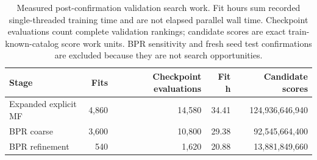 \begin{table}[H]
\centering
\caption{Measured post-confirmation validation search work. Fit hours sum recorded single-threaded training time and are not elapsed parallel wall time. Checkpoint evaluations count complete validation rankings; candidate scores are exact train-known-catalog score work units. BPR sensitivity and fresh seed test confirmations are excluded because they are not search opportunities.}
\label{tab:robustness-search-cost}
\small
\begin{tabular}{@{}lrrrr@{}}
\toprule
Stage & Fits & Checkpoint evaluations & Fit h & Candidate scores \\
\midrule
Expanded explicit MF & 4,860 & 14,580 & 34.41 & 124,936,646,940 \\
BPR coarse & 3,600 & 10,800 & 29.38 & 92,545,664,400 \\
BPR refinement & 540 & 1,620 & 20.88 & 13,881,849,660 \\
\bottomrule
\end{tabular}
\end{table}
